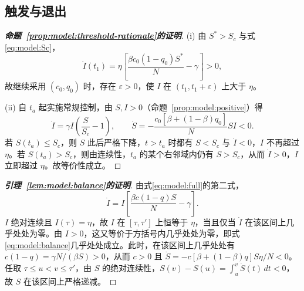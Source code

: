 \subsection{触发与退出}
\label{sec:proof:threshold-rationale}
\begin{proof}[\normalfont\bfseries 命题~\ref{prop:model:threshold-rationale}的证明]
(i) 由 $S^*>S_c$ 与式\eqref{eq:model:Sc}，
\[
\dot I(t_1)=\eta\left[\frac{\beta c_0(1-q_0)S^*}{N}-\gamma\right]>0,
\]
故继续采用 $(c_0,q_0)$ 时，存在 $\varepsilon>0$，使 $I$ 在 $(t_1,t_1+\varepsilon)$ 上大于 $\eta$。

(ii) 自 $t_a$ 起实施常规控制，由 $S,I>0$（命题~\ref{prop:model:positive}）得
\[
\dot I=\gamma I\left(\frac{S}{S_c}-1\right),\qquad
\dot S=-\frac{c_0[\beta+(1-\beta)q_0]}{N}SI<0.
\]
若 $S(t_a)\le S_c$，则 $S$ 此后严格下降，$t>t_a$ 时都有 $S<S_c$ 与 $\dot I<0$，$I$ 不再超过 $\eta$。若 $S(t_a)>S_c$，则由连续性，$t_a$ 的某个右邻域内仍有 $S>S_c$，从而 $\dot I>0$，$I$ 立即超过 $\eta$。故等价性成立。
\end{proof}

\begin{proof}[\normalfont\bfseries 引理~\ref{lem:model:balance}的证明]
由式\eqref{eq:model:full}的第二式，
\[
\dot I=I\left[\frac{\beta c(1-q)S}{N}-\gamma\right].
\]
$I$ 绝对连续且 $I(\tau)=\eta$，故 $I$ 在 $[\tau,\tau']$ 上恒等于 $\eta$，当且仅当 $\dot I$ 在该区间上几乎处处为零。由 $I>0$，这又等价于方括号内几乎处处为零，即式\eqref{eq:model:balance}几乎处处成立。此时，在该区间上几乎处处有 $c(1-q)=\gamma N/(\beta S)>0$，从而 $c>0$ 且 $\dot S=-c[\beta+(1-\beta)q]S\eta/N<0$。任取 $\tau\le u<v\le\tau'$，由 $S$ 的绝对连续性，$S(v)-S(u)=\int_u^v\dot S(t)\,dt<0$，故 $S$ 在该区间上严格递减。
\end{proof}

